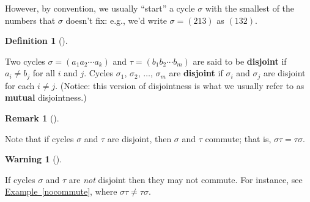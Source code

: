 \documentclass[10pt,]{book}
\newcommand{\terminology}[1]{\textbf{#1}}
\theoremstyle{plain}
\theoremstyle{definition}
\newtheorem{definition}[theorem]{Definition}
\theoremstyle{definition}
\newtheorem{remark}[theorem]{Remark}
\newtheorem{warning}[theorem]{Warning}
\theoremstyle{definition}
\theoremstyle{definition}
\numberwithin{equation}{section}
\begin{document}
    However, by convention, we usually ``start'' a cycle \(\sigma\)
    with the smallest of the numbers that \(\sigma\) doesn't fix: e.g.,
    we'd write \(\sigma=(213)\) as \((132)\).
\begin{definition}[{}]\label{definition-46}

        Two cycles \(\sigma=(a_1 a_2 \cdots a_k)\) and \(\tau=(b_1
        b_2 \cdots b_m)\) are said to be \terminology{disjoint} if \(a_i \neq
        b_j\) for all \(i\) and \(j\). Cycles \(\sigma_1\),
        \(\sigma_2\), \(\ldots\), \(\sigma_m\) are \terminology{disjoint} if \(\sigma_i\)
        and \(\sigma_j\) are disjoint for each \(i \neq j\). (Notice: this
        version of disjointness is what we usually refer to as \terminology{mutual} disjointness.)
\end{definition}
\begin{remark}[]\label{remark-28}

      Note that if cycles \(\sigma\) and \(\tau\) are disjoint, then \(\sigma\) and \(\tau\) commute; that is, \(\sigma \tau=\tau \sigma\).
\end{remark}
\begin{warning}[]\label{warning-17}

      If cycles \(\sigma\) and \(\tau\) are \emph{not} disjoint then they may not commute. For instance, see \hyperref[nocommute]{Example~\ref{nocommute}}, where \(\sigma\tau \neq \tau \sigma\).
\end{warning}
\par
\end{document}
